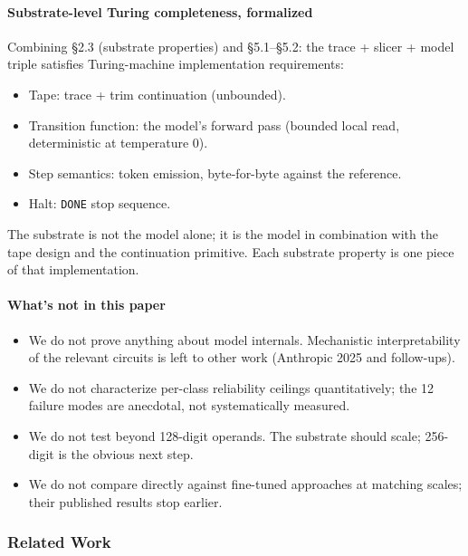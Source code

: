 \documentclass[twocolumn,switch,10pt]{article}
\providecommand{\tightlist}{\setlength{\itemsep}{0pt}\setlength{\parskip}{0pt}}
\begin{document}
\paragraph{Substrate-level Turing completeness, formalized}\label{substrate-level-turing-completeness-formalized}

Combining §2.3 (substrate properties) and §5.1--§5.2: the trace +
slicer + model triple satisfies Turing-machine implementation
requirements:

\begin{itemize}
\tightlist
\item
  Tape: trace + trim continuation (unbounded).
\item
  Transition function: the model's forward pass (bounded local read,
  deterministic at temperature 0).
\item
  Step semantics: token emission, byte-for-byte against the
  reference.
\item
  Halt: \texttt{DONE} stop sequence.
\end{itemize}

The substrate is not the model alone; it is the model in
combination with the tape design and the continuation primitive.
Each substrate property is one piece of that implementation.

\paragraph{What's not in this paper}\label{whats-not-in-this-paper}

\begin{itemize}
\tightlist
\item
  We do not prove anything about model internals. Mechanistic
  interpretability of the relevant circuits is left to other work
  (Anthropic 2025 and follow-ups).
\item
  We do not characterize per-class reliability ceilings
  quantitatively; the 12 failure modes are anecdotal, not
  systematically measured.
\item
  We do not test beyond 128-digit operands. The substrate should
  scale; 256-digit is the obvious next step.
\item
  We do not compare directly against fine-tuned approaches at
  matching scales; their published results stop earlier.
\end{itemize}

\subsubsection{Related Work}\label{related-work}
\end{document}
